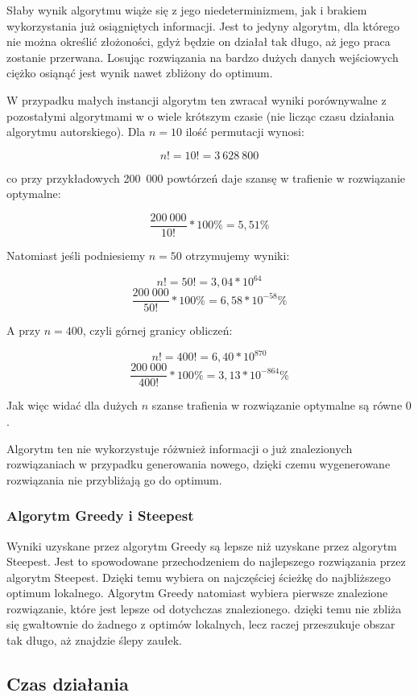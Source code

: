 Słaby wynik algorytmu wiąże się z jego niedeterminizmem, jak i brakiem wykorzystania 
już osiągniętych informacji. Jest to jedyny algorytm, dla którego nie można określić 
złożoności, gdyż będzie on działał tak długo, aż jego praca zostanie przerwana. Losując 
rozwiązania na bardzo dużych danych wejściowych ciężko osiąnąć jest wynik nawet zbliżony 
do optimum. 

W przypadku małych instancji algorytm ten zwracał wyniki porównywalne z 
pozostałymi algorytmami w o wiele krótszym czasie (nie licząc czasu działania algorytmu
autorskiego). Dla $ n = 10 $ ilość permutacji wynosi:

$$ n! = 10! = 3~628~800 $$

co przy przykładowych 200~000 powtórzeń daje szansę w trafienie w rozwiązanie optymalne:

$$ \frac{200~000}{10!} * 100\% = 5,51\%  $$

Natomiast jeśli podniesiemy $ n = 50 $ otrzymujemy wyniki:

$$ n! = 50! = 3,04 * 10^{64} $$
$$ \frac{200~000}{50!} * 100\% = 6,58 * 10^{-58}\%  $$

A przy $ n = 400 $, czyli górnej granicy obliczeń:

$$ n! = 400! = 6,40 * 10^{870} $$
$$ \frac{200~000}{400!} * 100\% = 3,13 * 10^{-864}\%  $$

Jak więc widać dla dużych $ n $ szanse trafienia w rozwiązanie optymalne są równe $ 0 $.

Algorytm ten nie wykorzystuje różwnież informacji o już znalezionych rozwiązaniach 
w przypadku generowania nowego, dzięki czemu wygenerowane rozwiązania nie przybliżają
go do optimum.

\subsubsection{Algorytm Greedy i Steepest}

Wyniki uzyskane przez algorytm Greedy są lepsze niż uzyskane przez algorytm Steepest. 
Jest to spowodowane przechodzeniem do najlepszego rozwiązania przez algorytm Steepest. 
Dzięki temu wybiera on najczęściej ścieżkę do najbliższego optimum lokalnego. Algorytm
Greedy natomiast wybiera pierwsze znalezione rozwiązanie, które jest lepsze od dotychczas 
znalezionego. dzięki temu nie zbliża się gwałtownie do żadnego z optimów lokalnych, lecz 
raczej przeszukuje obszar tak długo, aż znajdzie ślepy zaułek.


\subsection{Czas działania}

